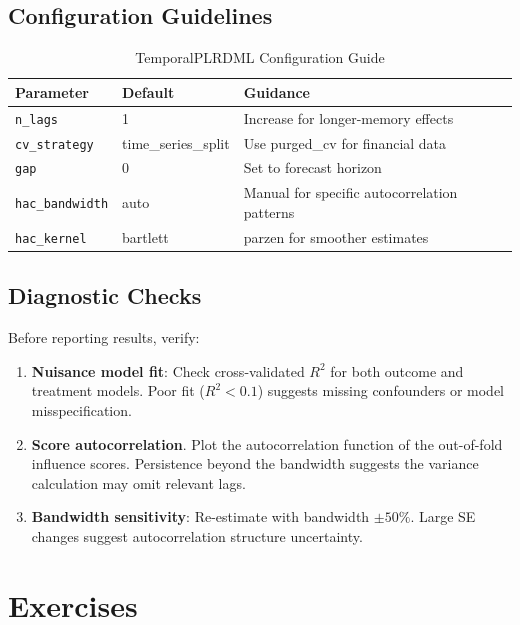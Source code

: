 \subsection{Configuration Guidelines}

\begin{table}[htbp]
\centering
\caption{TemporalPLRDML Configuration Guide}
\label{tab:config_guide}
\begin{tabular}{lll}
\hline
\textbf{Parameter} & \textbf{Default} & \textbf{Guidance} \\
\hline
\texttt{n\_lags} & 1 & Increase for longer-memory effects \\
\texttt{cv\_strategy} & time\_series\_split & Use purged\_cv for financial data \\
\texttt{gap} & 0 & Set to forecast horizon \\
\texttt{hac\_bandwidth} & auto & Manual for specific autocorrelation patterns \\
\texttt{hac\_kernel} & bartlett & parzen for smoother estimates \\
\hline
\end{tabular}
\end{table}

\subsection{Diagnostic Checks}

Before reporting results, verify:

\begin{enumerate}
    \item \textbf{Nuisance model fit}: Check cross-validated $R^2$ for both outcome and treatment models. Poor fit ($R^2 < 0.1$) suggests missing confounders or model misspecification.

    \item \textbf{Score autocorrelation}. Plot the autocorrelation function of the out-of-fold influence scores. Persistence beyond the bandwidth suggests the variance calculation may omit relevant lags.

    \item \textbf{Bandwidth sensitivity}: Re-estimate with bandwidth $\pm 50\%$. Large SE changes suggest autocorrelation structure uncertainty.
\end{enumerate}

\section{Exercises}\label{sec:ch05_exercises}

